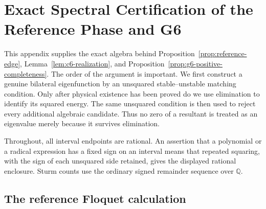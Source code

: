 \section{Exact Spectral Certification of the Reference Phase and G6}
\label{app:g6-certification}

This appendix supplies the exact algebra behind
Proposition~\ref{prop:reference-edge},
Lemma~\ref{lem:c6-realization}, and
Proposition~\ref{prop:g6-positive-completeness}.  The order of the argument
is important.  We first construct a genuine bilateral eigenfunction by an
unsquared stable--unstable matching condition.  Only after physical
existence has been proved do we use elimination to identify its squared
energy.  The same unsquared condition is then used to reject every
additional algebraic candidate.  Thus no zero of a resultant is treated as
an eigenvalue merely because it survives elimination.

Throughout, all interval endpoints are rational.  An assertion that a
polynomial or a radical expression has a fixed sign on an interval means
that repeated squaring, with the sign of each unsquared side retained,
gives the displayed rational enclosure.  Sturm counts use the ordinary
signed remainder sequence over \(\mathbb Q\).

\subsection{The reference Floquet calculation}
\label{appsubsec:reference-floquet}

